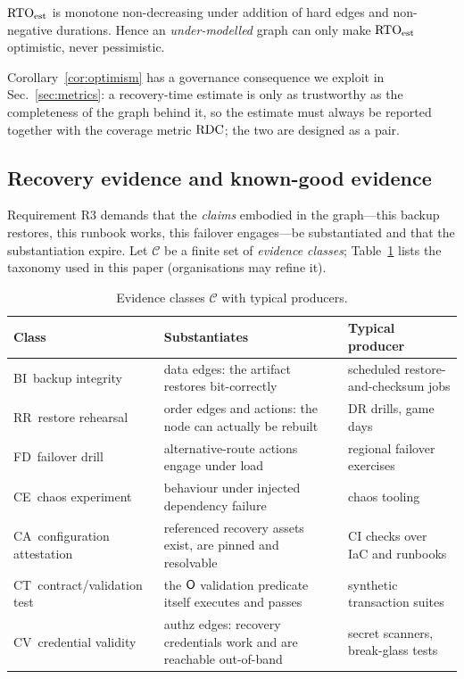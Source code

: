 \begin{corollary}
\label{cor:optimism}
$\mathrm{RTO}_{\mathrm{est}}$ is monotone non-decreasing under addition of hard edges and non-negative durations. Hence an \emph{under-modelled} graph can only make $\mathrm{RTO}_{\mathrm{est}}$ optimistic, never pessimistic.
\end{corollary}

Corollary~\ref{cor:optimism} has a governance consequence we exploit in Sec.~\ref{sec:metrics}: a recovery-time estimate is only as trustworthy as the completeness of the graph behind it, so the estimate must always be reported together with the coverage metric $\mathrm{RDC}$; the two are designed as a pair.

\subsection{Recovery evidence and known-good evidence}
\label{sec:evidence}

Requirement R3 demands that the \emph{claims} embodied in the graph---this backup restores, this runbook works, this failover engages---be substantiated and that the substantiation expire. Let $\mathcal{C}$ be a finite set of \emph{evidence classes}; Table~\ref{tab:evidence} lists the taxonomy used in this paper (organisations may refine it).

\begin{table}[t]
\centering\small
\caption{Evidence classes $\mathcal{C}$ with typical producers.}
\label{tab:evidence}
\begin{tabularx}{\textwidth}{@{}l l X@{}}
\toprule
\textbf{Class} & \textbf{Substantiates} & \textbf{Typical producer} \\
\midrule
BI\ backup integrity & data edges: the artifact restores bit-correctly & scheduled restore-and-checksum jobs \\
RR\ restore rehearsal & order edges and actions: the node can actually be rebuilt & DR drills, game days \citep{krishnan2012weathering} \\
FD\ failover drill & alternative-route actions engage under load & regional failover exercises \\
CE\ chaos experiment & behaviour under injected dependency failure & chaos tooling \citep{basiri2016chaos,litmuschaos} \\
CA\ configuration attestation & referenced recovery assets exist, are pinned and resolvable & CI checks over IaC and runbooks \\
CT\ contract/validation test & the $\mathsf{O}$ validation predicate itself executes and passes & synthetic transaction suites \\
CV\ credential validity & authz edges: recovery credentials work and are reachable out-of-band & secret scanners, break-glass tests \\
\bottomrule
\end{tabularx}
\end{table}

